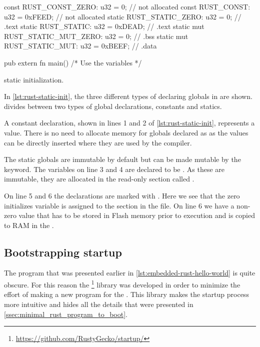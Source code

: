 \begin{listing}[H]
\begin{rustcode}
const      RUST_CONST_ZERO: u32 = 0;      // not allocated
const      RUST_CONST: u32 = 0xFEED;      // not allocated
static     RUST_STATIC_ZERO: u32 = 0;     // .text
static     RUST_STATIC: u32 = 0xDEAD;     // .text
static mut RUST_STATIC_MUT_ZERO: u32 = 0; // .bss
static mut RUST_STATIC_MUT: u32 = 0xBEEF; // .data

pub extern fn main() { /* Use the variables */ }
\end{rustcode}
\caption{{\rust} static initialization.}
\label{lst:rust-static-init}
\end{listing}

In \autoref{lst:rust-static-init}, the three different types of declaring globals in {\rust} are shown.
{\rust} divides between two types of global declarations, constants and statics.

A constant declaration, shown in lines 1 and 2 of \autoref{lst:rust-static-init}, represents a value.
There is no need to allocate memory for globals declared as  as the values can be directly inserted where they are used by the compiler.

The static globals are immutable by default but can be made mutable by the  keyword.
The variables on line 3 and 4 are declared to be .
As these are immutable, they are allocated in the read-only section called .

On line 5 and 6 the declarations are marked with .
Here we see that the zero initializes variable is assigned to the  section in the {\elf} file.
On line 6 we have a non-zero value that has to be stored in Flash memory prior to execution and is copied to RAM in the .

\subsection{Bootstrapping startup}
\label{sec:startup}

The {\rust} program that was presented earlier in \autoref{lst:embedded-rust-hello-world} is quite obscure.
For this reason the  \footnote{\url{https://github.com/RustyGecko/startup/}} library was developed in order to minimize the effort of making a new {\rust} program for the {\gecko}.
This library makes the startup process more intuitive and hides all the details that were presented in \autoref{ssec:minimal_rust_program_to_boot}.

